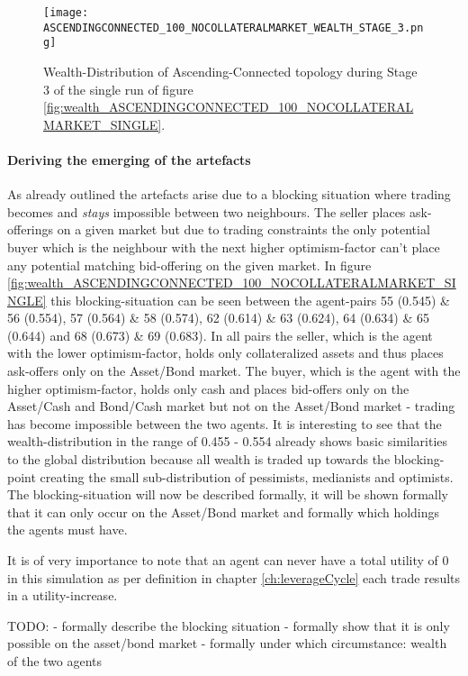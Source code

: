 \documentclass[Bachelorarbeit.tex]{subfiles}
\begin{document}
\begin{figure}[H]
	\centering
  \texttt{[image: ASCENDINGCONNECTED\_100\_NOCOLLATERALMARKET\_WEALTH\_STAGE\_3.png]}
  	\caption{Wealth-Distribution of Ascending-Connected topology during Stage 3 of the single run of figure \ref{fig:wealth_ASCENDINGCONNECTED_100_NOCOLLATERALMARKET_SINGLE}.}
	\label{fig:markets_ASCENDINGCONNECTED_100_NOCOLLATERALMARKET_WEALTH_STAGE_3}
\end{figure}

\paragraph{Deriving the emerging of the artefacts}
As already outlined the artefacts arise due to a blocking situation where trading becomes and \textit{stays} impossible between two neighbours. The seller places ask-offerings on a given market but due to trading constraints the only potential buyer which is the neighbour with the next higher optimism-factor can't place any potential matching bid-offering on the given market. In figure \ref{fig:wealth_ASCENDINGCONNECTED_100_NOCOLLATERALMARKET_SINGLE} this blocking-situation can be seen between the agent-pairs 55 (0.545) \& 56 (0.554), 57 (0.564) \& 58 (0.574), 62 (0.614) \& 63 (0.624), 64 (0.634) \& 65 (0.644) and 68 (0.673) \& 69 (0.683). In all pairs the seller, which is the agent with the lower optimism-factor, holds only collateralized assets and thus places ask-offers only on the Asset/Bond market. The buyer, which is the agent with the higher optimism-factor, holds only cash and places bid-offers only on the Asset/Cash and Bond/Cash market but not on the Asset/Bond market - trading has become impossible between the two agents. It is interesting to see that the wealth-distribution in the range of 0.455 - 0.554 already shows basic similarities to the global distribution because all wealth is traded up towards the blocking-point creating the small sub-distribution of pessimists, medianists and optimists. The blocking-situation will now be described formally, it will be shown formally that it can only occur on the Asset/Bond market and formally which holdings the agents must have.

\medskip

It is of very importance to note that an agent can never have a total utility of 0 in this simulation as per definition in chapter \ref{ch:leverageCycle} each trade results in a utility-increase.

TODO:
- formally describe the blocking situation
- formally show that it is only possible on the asset/bond market
- formally under which circumstance: wealth of the two agents
\end{document}
